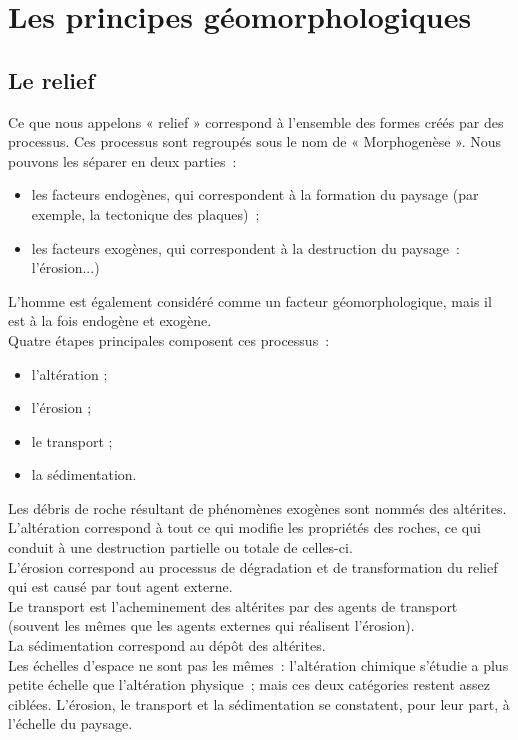 \documentclass[a4paper,11pt]{article}
\begin{document}
\section{Les principes géomorphologiques}

\subsection{Le relief}

Ce que nous appelons « relief » correspond à l'ensemble des formes créés par des processus.
Ces processus sont regroupés sous le nom de « Morphogenèse ».
Nous pouvons les séparer en deux parties~:
\begin{itemize}
  \item les facteurs endogènes, qui correspondent à la formation du paysage (par exemple, la tectonique des plaques)~;
  \item les facteurs exogènes, qui correspondent à la destruction du paysage~: l'érosion...)
\end{itemize}
L'homme est également considéré comme un facteur géomorphologique, mais il est à la fois endogène et exogène. \\

Quatre étapes principales composent ces processus~:
\begin{itemize}
  \item l'altération ;
  \item l'érosion ;
  \item le transport ;
  \item la sédimentation.
\end{itemize}
Les débris de roche résultant de phénomènes exogènes sont nommés des altérites. \\
L'altération correspond à tout ce qui modifie les propriétés des roches, ce qui conduit à une destruction partielle ou totale de celles-ci. \\
L'érosion correspond au processus de dégradation et de transformation du relief qui est causé par tout agent externe. \\
Le transport est l'acheminement des altérites par des agents de transport (souvent les mêmes que les agents externes qui réalisent l'érosion). \\
La sédimentation correspond au dépôt des altérites. \\

Les échelles d'espace ne sont pas les mêmes~: l'altération chimique s'étudie a plus petite échelle que l'altération physique~; mais ces deux catégories restent assez ciblées.
L'érosion, le transport et la sédimentation se constatent, pour leur part, à l'échelle du paysage. \\
\end{document}

